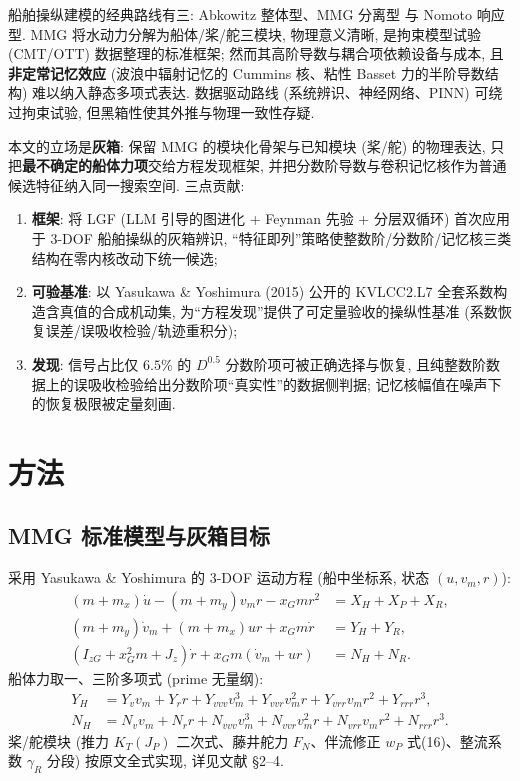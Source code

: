 \documentclass[12pt,a4paper]{ctexart}
\begin{document}
船舶操纵建模的经典路线有三: Abkowitz 整体型\cite{abkowitz1980}、MMG 分离型\cite{yasukawa2015} 与 Nomoto 响应型\cite{nomoto1957}. MMG 将水动力分解为船体/桨/舵三模块, 物理意义清晰, 是拘束模型试验 (CMT/OTT) 数据整理的标准框架; 然而其高阶导数与耦合项依赖设备与成本, 且\textbf{非定常记忆效应} (波浪中辐射记忆的 Cummins 核\cite{cummins1962}、粘性 Basset 力的半阶导数结构\cite{mainardi1997}) 难以纳入静态多项式表达. 数据驱动路线 (系统辨识、神经网络、PINN\cite{raissi2019}) 可绕过拘束试验, 但黑箱性使其外推与物理一致性存疑.

本文的立场是\textbf{灰箱}: 保留 MMG 的模块化骨架与已知模块 (桨/舵) 的物理表达, 只把\textbf{最不确定的船体力项}交给方程发现框架, 并把分数阶导数与卷积记忆核作为普通候选特征纳入同一搜索空间. 三点贡献:

\begin{enumerate}[itemsep=1pt,topsep=2pt]
\item \textbf{框架}: 将 LGF (LLM 引导的图进化 + Feynman 先验 + 分层双循环) 首次应用于 3-DOF 船舶操纵的灰箱辨识, ``特征即列''策略使整数阶/分数阶/记忆核三类结构在零内核改动下统一候选;
\item \textbf{可验基准}: 以 Yasukawa \& Yoshimura (2015) 公开的 KVLCC2.L7 全套系数构造含真值的合成机动集, 为``方程发现''提供了可定量验收的操纵性基准 (系数恢复误差/误吸收检验/轨迹重积分);
\item \textbf{发现}: 信号占比仅 $6.5\%$ 的 $D^{0.5}$ 分数阶项可被正确选择与恢复, 且纯整数阶数据上的误吸收检验给出分数阶项``真实性''的数据侧判据; 记忆核幅值在噪声下的恢复极限被定量刻画.
\end{enumerate}

\section{方法}
\label{sec:method}

\subsection{MMG 标准模型与灰箱目标}
\label{sec:mmg}

采用 Yasukawa \& Yoshimura\cite{yasukawa2015} 的 3-DOF 运动方程 (船中坐标系, 状态 $(u, v_m, r)$):
\begin{align}
(m+m_x)\dot u - (m+m_y)v_m r - x_G m r^2 &= X_H + X_P + X_R, \label{eq:x}\\
(m+m_y)\dot v_m + (m+m_x)u r + x_G m \dot r &= Y_H + Y_R, \label{eq:y}\\
(I_{zG}+x_G^2 m+J_z)\dot r + x_G m(\dot v_m + u r) &= N_H + N_R. \label{eq:n}
\end{align}
船体力取一、三阶多项式 (prime 无量纲):
\begin{align}
Y_H &= Y_v v_m + Y_r r + Y_{vvv}v_m^3 + Y_{vvr}v_m^2 r + Y_{vrr}v_m r^2 + Y_{rrr}r^3, \label{eq:yh}\\
N_H &= N_v v_m + N_r r + N_{vvv}v_m^3 + N_{vvr}v_m^2 r + N_{vrr}v_m r^2 + N_{rrr}r^3. \label{eq:nh}
\end{align}
桨/舵模块 (推力 $K_T(J_P)$ 二次式、藤井舵力 $F_N$、伴流修正 $w_P$ 式(16)、整流系数 $\gamma_R$ 分段) 按原文全式实现, 详见文献\cite{yasukawa2015} §2--4.
\end{document}
